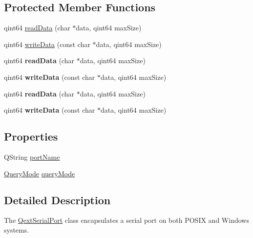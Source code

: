 \subsection*{Protected Member Functions}
\begin{DoxyCompactItemize}
\item 
qint64 \mbox{\hyperlink{class_qext_serial_port_a7b663c8cce06efc774d5d3f9fa40ff6e}{read\+Data}} (char $\ast$data, qint64 max\+Size)
\item 
qint64 \mbox{\hyperlink{class_qext_serial_port_acb7598e14f929c0fcf64ba2b71673e5d}{write\+Data}} (const char $\ast$data, qint64 max\+Size)
\item 
\mbox{\label{class_qext_serial_port_a7b663c8cce06efc774d5d3f9fa40ff6e}} 
qint64 {\bfseries read\+Data} (char $\ast$data, qint64 max\+Size)
\item 
\mbox{\label{class_qext_serial_port_acb7598e14f929c0fcf64ba2b71673e5d}} 
qint64 {\bfseries write\+Data} (const char $\ast$data, qint64 max\+Size)
\item 
\mbox{\label{class_qext_serial_port_a7b663c8cce06efc774d5d3f9fa40ff6e}} 
qint64 {\bfseries read\+Data} (char $\ast$data, qint64 max\+Size)
\item 
\mbox{\label{class_qext_serial_port_acb7598e14f929c0fcf64ba2b71673e5d}} 
qint64 {\bfseries write\+Data} (const char $\ast$data, qint64 max\+Size)
\end{DoxyCompactItemize}
\subsection*{Properties}
\begin{DoxyCompactItemize}
\item 
Q\+String \mbox{\hyperlink{class_qext_serial_port_a541042ffa6d24b057b755ab19d128742}{port\+Name}}
\item 
\mbox{\hyperlink{class_qext_serial_port_a269e1f3656224a10c321bd70ab89cf64}{Query\+Mode}} \mbox{\hyperlink{class_qext_serial_port_a5cc35c36e00015a1616886b3f301b2b7}{query\+Mode}}
\end{DoxyCompactItemize}


\subsection{Detailed Description}
The \mbox{\hyperlink{class_qext_serial_port}{Qext\+Serial\+Port}} class encapsulates a serial port on both P\+O\+S\+IX and Windows systems. 



